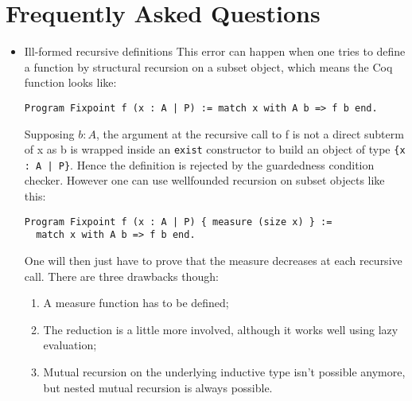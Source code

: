 \section{Frequently Asked Questions
  \label{ProgramFAQ}}

\begin{itemize}
\item {Ill-formed recursive definitions}
  This error can happen when one tries to define a
  function by structural recursion on a subset object, which means the Coq
  function looks like:
  
  \verb$Program Fixpoint f (x : A | P) := match x with A b => f b end.$
  
  Supposing $b : A$, the argument at the recursive call to f is not a
  direct subterm of x as b is wrapped inside an {\tt exist} constructor to build
  an object of type \verb${x : A | P}$.  Hence the definition is rejected
  by the guardedness condition checker. However one can use
  wellfounded recursion on subset objects like this:
  
\begin{verbatim}
Program Fixpoint f (x : A | P) { measure (size x) } :=
  match x with A b => f b end.
\end{verbatim}
  
  One will then just have to prove that the measure decreases at each recursive
  call. There are three drawbacks though: 
  \begin{enumerate}
  \item A measure function has to be defined;
  \item The reduction is a little more involved, although it works well
    using lazy evaluation;
  \item Mutual recursion on the underlying inductive type isn't possible
    anymore, but nested mutual recursion is always possible.
  \end{enumerate}
\end{itemize}

